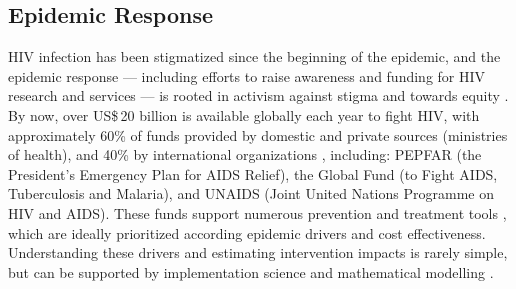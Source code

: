 \subsection{Epidemic Response}\label{intro.hiv.resp}
HIV infection has been stigmatized since the beginning of the epidemic, and the epidemic response
--- including efforts to raise awareness and funding for HIV research and services ---
is rooted in activism against stigma and towards equity \cite{Merson2008}.
By now, over US\$\,20 billion is available globally each year to fight HIV, with approximately
60\% of funds provided by domestic and private sources (\eg ministries of health), and
40\% by international organizations \cite{UNAIDSFin}, including:
PEPFAR (the President's Emergency Plan for AIDS Relief),
the Global Fund (to Fight AIDS, Tuberculosis and Malaria), and
UNAIDS (Joint United Nations Programme on HIV and AIDS).
These funds support numerous prevention and treatment tools \cite{Eisinger2019tk},
which are ideally prioritized according epidemic drivers and cost effectiveness.
Understanding these drivers and estimating intervention impacts is rarely simple,
but can be supported by implementation science and mathematical modelling
\cite{Shelton2010,Mutevedzi2014,Geffen2018,Baral2019,Schwartz2022}.

